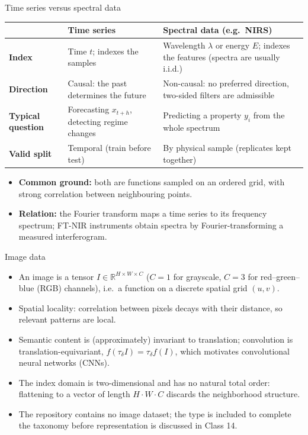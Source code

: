 \begin{frame}{Time series versus spectral data}
\vspace{0.1em}
\begingroup\scriptsize
\begin{tabularx}{\textwidth}{>{\bfseries}l >{\raggedright\arraybackslash}X >{\raggedright\arraybackslash}X}
& \bfseries Time series & \bfseries Spectral data (e.g.\ NIRS) \\
\toprule
Index & Time $t$; indexes the samples & Wavelength $\lambda$ or energy $E$; indexes the features (spectra are usually i.i.d.) \\
Direction & Causal: the past determines the future & Non-causal: no preferred direction, two-sided filters are admissible \\
Typical question & Forecasting $x_{t+h}$, detecting regime changes & Predicting a property $y_i$ from the whole spectrum \\
Valid split & Temporal (train before test) & By physical sample (replicates kept together) \\
\bottomrule
\end{tabularx}
\endgroup

\vspace{0.4em}
\begin{itemize}\footnotesize
\item \textbf{Common ground:} both are functions sampled on an ordered grid, with strong correlation between neighbouring points.
\item \textbf{Relation:} the Fourier transform maps a time series to its frequency spectrum; FT-NIR instruments obtain spectra by Fourier-transforming a measured interferogram.
\end{itemize}
\coursefooter
\end{frame}

\begin{frame}{Image data}
\begin{itemize}
\item An image is a tensor $I \in \mathbb{R}^{H \times W \times C}$ ($C = 1$ for grayscale, $C = 3$ for red--green--blue (RGB) channels), i.e.\ a function on a discrete spatial grid $(u, v)$.
\item Spatial locality: correlation between pixels decays with their distance, so relevant patterns are local.
\item Semantic content is (approximately) invariant to translation; convolution is translation-equivariant, $f(\tau_{\delta} I) = \tau_{\delta} f(I)$, which motivates convolutional neural networks (CNNs).
\item The index domain is two-dimensional and has no natural total order: flattening to a vector of length $H \cdot W \cdot C$ discards the neighborhood structure.
\item The repository contains no image dataset; the type is included to complete the taxonomy before representation is discussed in Class 14.
\end{itemize}
\coursefooter
\end{frame}

